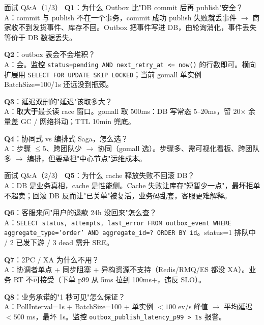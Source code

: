 \documentclass[aspectratio=169,11pt]{beamer}
\begin{document}
\begin{frame}[shrink]{面试 Q\&A（1/3）}
\textbf{Q1}：为什么 Outbox 比"DB commit 后再 publish"安全？\\
\hspace{4mm}\small A：commit 与 publish 不在一个事务，commit 成功 publish 失败就丢事件 $\to$ 商家收不到发货事件、库存不回。Outbox 把事件写进 DB，由轮询消化，事件丢失等价于 DB 数据丢失。

\vspace{2mm}
\textbf{Q2}：outbox 表会不会堆积？\\
\hspace{4mm}\small A：会。监控 \texttt{status=pending AND next\_retry\_at <= now()} 的行数即可。横向扩展用 \texttt{SELECT FOR UPDATE SKIP LOCKED}；当前 gomall 单实例 BatchSize=100/1s 还远没到瓶颈。

\vspace{2mm}
\textbf{Q3}：延迟双删的"延迟"该取多大？\\
\hspace{4mm}\small A：取\textbf{大于}最长读 race 窗口。gomall 取 500ms：DB 写常态 5--20ms，留 20$\times$ 余量盖 GC / 网络抖动；TTL 10min 兜底。

\vspace{2mm}
\textbf{Q4}：协同式 vs 编排式 Saga，怎么选？\\
\hspace{4mm}\small A：步骤 $\leq 5$、跨团队少 $\to$ 协同（gomall 选）。步骤多、需可视化看板、跨团队多 $\to$ 编排，但要承担"中心节点"运维成本。
\end{frame}

\begin{frame}[shrink]{面试 Q\&A（2/3）}
\textbf{Q5}：为什么 cache 释放失败不回滚 DB？\\
\hspace{4mm}\small A：DB 是业务真相，cache 是性能侧。Cache 失败让库存"短暂少一点"，最坏拒单不超卖；回滚 DB 反而让"已关单"被复活，业务码乱套，客服更难解释。

\vspace{2mm}
\textbf{Q6}：客服来问"用户的退款 24h 没回来"怎么查？\\
\hspace{4mm}\small A：\texttt{SELECT status, attempts, last\_error FROM outbox\_event WHERE aggregate\_type='order' AND aggregate\_id=? ORDER BY id}。status=1 排队中 / 2 已发下游 / 3 dead 需升 SRE。

\vspace{2mm}
\textbf{Q7}：2PC / XA 为什么不用？\\
\hspace{4mm}\small A：协调者单点 + 同步阻塞 + 异构资源不支持（Redis/RMQ/ES 都没 XA）。业务 RT 不可接受（下单 p99 从 5ms 拉到 100ms+，违反 SLO）。

\vspace{2mm}
\textbf{Q8}：业务承诺的"1 秒可见"怎么保证？\\
\hspace{4mm}\small A：PollInterval=1s + BatchSize=100 + 单实例 $< 100$ ev/s 峰值 $\to$ 平均延迟 $< 500$ ms，最坏 1s。监控 \texttt{outbox\_publish\_latency\_p99 > 1s} 报警。
\end{frame}
\end{document}
